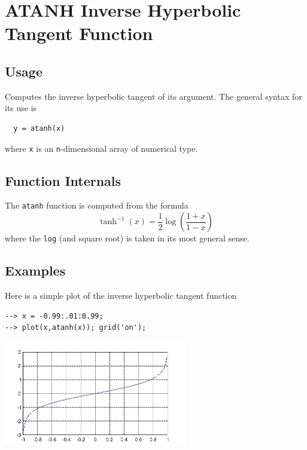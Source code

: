 \section{ATANH Inverse Hyperbolic Tangent Function}

\subsection{Usage}

Computes the inverse hyperbolic tangent of its argument.  The general
syntax for its use is
\begin{verbatim}
  y = atanh(x)
\end{verbatim}
where \verb|x| is an \verb|n|-dimensional array of numerical type.
\subsection{Function Internals}

The \verb|atanh| function is computed from the formula
\[
   \tanh^{-1}(x) = \frac{1}{2}\log\left(\frac{1+x}{1-x}\right)
\]
where the \verb|log| (and square root) is taken in its most general sense.
\subsection{Examples}

Here is a simple plot of the inverse hyperbolic tangent function
\begin{verbatim}
--> x = -0.99:.01:0.99;
--> plot(x,atanh(x)); grid('on');
\end{verbatim}


\centerline{\includegraphics[width=8cm]{atanhplot}}

